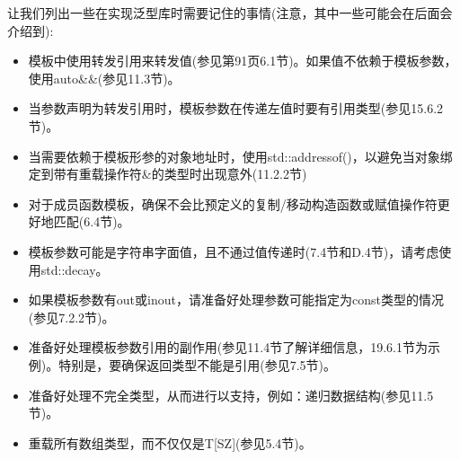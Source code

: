 让我们列出一些在实现泛型库时需要记住的事情(注意，其中一些可能会在后面会介绍到):

\begin{itemize}
\item 
模板中使用转发引用来转发值(参见第91页6.1节)。如果值不依赖于模板参数，使用auto\&\&(参见11.3节)。

\item 
当参数声明为转发引用时，模板参数在传递左值时要有引用类型(参见15.6.2节)。

\item 
当需要依赖于模板形参的对象地址时，使用std::addressof()，以避免当对象绑定到带有重载操作符\&的类型时出现意外(11.2.2节)

\item 
对于成员函数模板，确保不会比预定义的复制/移动构造函数或赋值操作符更好地匹配(6.4节)。

\item 
模板参数可能是字符串字面值，且不通过值传递时(7.4节和D.4节)，请考虑使用std::decay。

\item 
如果模板参数有out或inout，请准备好处理参数可能指定为const类型的情况(参见7.2.2节)。

\item 
准备好处理模板参数引用的副作用(参见11.4节了解详细信息，19.6.1节为示例)。特别是，要确保返回类型不能是引用(参见7.5节)。

\item 
准备好处理不完全类型，从而进行以支持，例如：递归数据结构(参见11.5节)。

\item 
重载所有数组类型，而不仅仅是T[SZ](参见5.4节)。
\end{itemize}